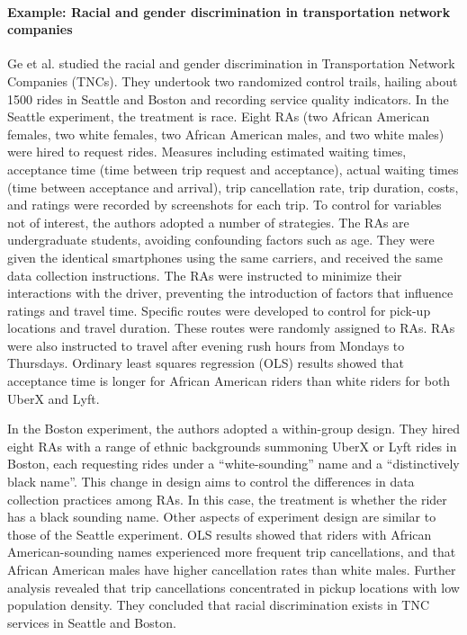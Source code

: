 \documentclass[11pt]{article}
\begin{document}
\paragraph{Example: Racial and gender discrimination in transportation network companies}
Ge et al.\cite{ge2016racial} studied the racial and gender discrimination in Transportation Network Companies (TNCs). They undertook two randomized control trails, hailing about 1500 rides in Seattle and Boston and recording service quality indicators. In the  Seattle experiment, the treatment is race. Eight RAs (two African American females, two white females, two African American males, and two white males) were hired to request rides. Measures including estimated waiting times, acceptance time (time between trip request and acceptance), actual waiting times (time between acceptance and arrival), trip cancellation rate, trip duration, costs, and ratings were recorded by screenshots for each trip. To control for variables not of interest, the authors adopted a number of strategies. The RAs are undergraduate students, avoiding confounding factors such as age. They were given the identical smartphones using the same carriers, and received the same data collection instructions. The RAs were instructed to minimize their interactions with the driver, preventing the introduction of factors that influence ratings and travel time. Specific routes were developed to control for pick-up locations and travel duration. These routes were randomly assigned to RAs. RAs were also instructed to travel after evening rush hours from Mondays to Thursdays. Ordinary least squares regression (OLS) results showed that acceptance time is longer for African American riders than white riders for both UberX and Lyft. 

In the Boston experiment, the authors adopted a within-group design. They hired eight RAs with a range of ethnic backgrounds summoning UberX or Lyft rides in Boston, each requesting rides under a “white-sounding” name and a “distinctively black name”. This change in design aims to control the differences in data collection practices among RAs. In this case, the treatment is whether the rider has a black sounding name. Other aspects of experiment design are similar to those of the Seattle experiment. OLS results showed that riders with African American-sounding names experienced more frequent trip cancellations, and that African American males have higher cancellation rates than white males. Further analysis revealed that trip cancellations concentrated in pickup locations with low population density. They concluded that racial discrimination exists in TNC services in Seattle and Boston.
\end{document}
